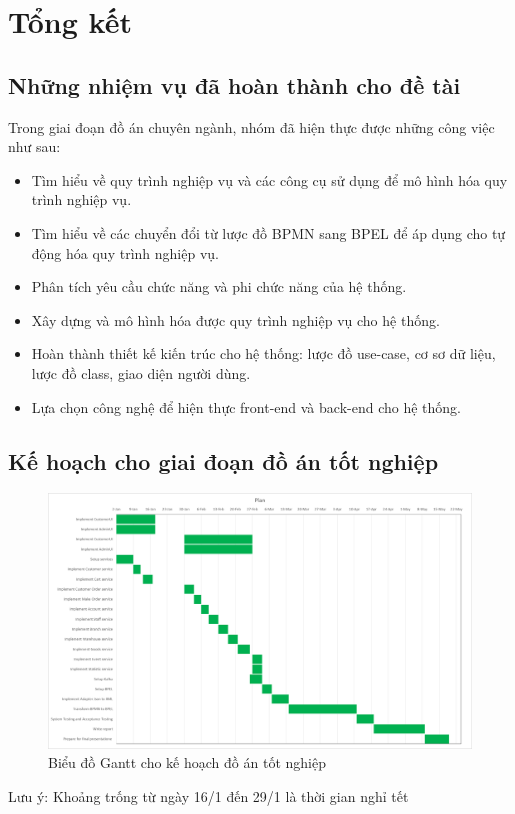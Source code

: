 \section{Tổng kết}
\subsection{Những nhiệm vụ đã hoàn thành cho đề tài}
Trong giai đoạn đồ án chuyên ngành, nhóm đã hiện thực được những công việc như sau:
\begin{itemize}
    \item Tìm hiểu về quy trình nghiệp vụ và các công cụ sử dụng để mô hình hóa quy trình nghiệp vụ.
    \item Tìm hiểu về các chuyển đổi từ lược đồ BPMN sang BPEL để áp dụng cho tự động hóa quy trình nghiệp vụ. 
    \item Phân tích yêu cầu chức năng và phi chức năng của hệ thống.
    \item Xây dựng và mô hình hóa được quy trình nghiệp vụ cho hệ thống.
    \item Hoàn thành thiết kế kiến trúc cho hệ thống: lược đồ use-case, cơ sơ dữ liệu, lược đồ class, giao diện người dùng.
    \item  Lựa chọn công nghệ để hiện thực front-end và back-end cho hệ thống.
\end{itemize}


\subsection{Kế hoạch cho giai đoạn đồ án tốt nghiệp}

\begin{figure}[h]
    \begin{center}
        \includegraphics[width=14cm]{img/plan.png}
    \end{center}
    \caption{Biểu đồ Gantt cho kế hoạch đồ án tốt nghiệp}
\end{figure}

Lưu ý: Khoảng trống từ ngày 16/1 đến 29/1 là thời gian nghỉ tết


